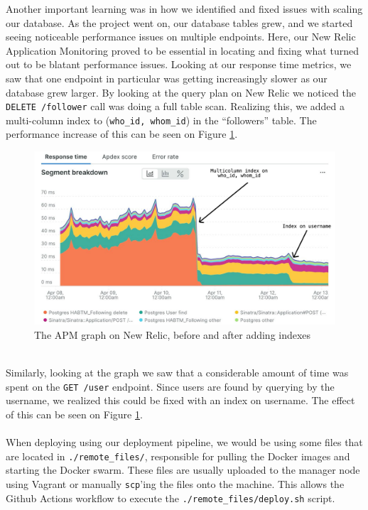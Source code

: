 \documentclass{article}
\begin{document}
Another important learning was in how we identified and fixed issues with scaling our database. As the project went on, our database tables grew, and we started seeing noticeable performance issues on multiple endpoints. Here, our New Relic Application Monitoring proved to be essential in locating and fixing what turned out to be blatant performance issues. Looking at our response time metrics, we saw that one endpoint in particular was getting increasingly slower as our database grew larger. By looking at the query plan on New Relic we noticed the \texttt{DELETE /follower} call was doing a full table scan. Realizing this, we added a multi-column index to (\texttt{who\_id, whom\_id}) in the ``followers'' table. The performance increase of this can be seen on Figure \ref{fig:index_apm}.
\begin{figure}[h]
    \centering
    \includegraphics[width=\textwidth]{images/index_apm.png}
    \caption{The APM graph on New Relic, before and after adding indexes}
    \label{fig:index_apm}
\end{figure}
\\Similarly, looking at the graph we saw that a considerable amount of time was spent on the \texttt{GET /user} endpoint. Since users are found by querying by the username, we realized this could be fixed with an index on username. The effect of this can be seen on Figure \ref{fig:index_apm}.
\\\\
When deploying using our deployment pipeline, we would be using some files that are located in \texttt{./remote\_files/}, responsible for pulling the Docker images and starting the Docker swarm. These files are usually uploaded to the manager node using Vagrant or manually \texttt{scp}'ing the files onto the machine. This allows the Github Actions workflow to execute the \texttt{./remote\_files/deploy.sh} script.
\end{document}
